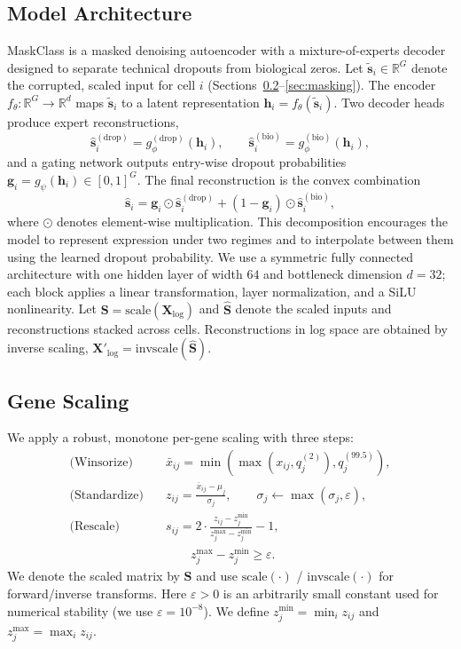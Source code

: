 \documentclass[sigconf,review]{acmart}
\theoremstyle{plain}
\theoremstyle{definition}
\theoremstyle{remark}
\begin{document}
\subsection{Model Architecture}
MaskClass is a masked denoising autoencoder with a mixture-of-experts decoder
designed to separate technical dropouts from biological zeros. Let
$\tilde{\mathbf{s}}_i\in\mathbb{R}^G$ denote the corrupted, scaled input for
cell $i$ (Sections~\ref{sec:scaling}--\ref{sec:masking}). The encoder
$f_\theta:\mathbb{R}^{G}\!\to\!\mathbb{R}^{d}$ maps $\tilde{\mathbf{s}}_i$ to a
latent representation $\mathbf{h}_i=f_\theta(\tilde{\mathbf{s}}_i)$.
Two decoder heads produce expert reconstructions,
\[
\hat{\mathbf{s}}^{(\mathrm{drop})}_i=g^{(\mathrm{drop})}_\phi(\mathbf{h}_i),\qquad
\hat{\mathbf{s}}^{(\mathrm{bio})}_i=g^{(\mathrm{bio})}_\phi(\mathbf{h}_i),
\]
and a gating network outputs entry-wise dropout probabilities
$\mathbf{g}_i=g_\psi(\mathbf{h}_i)\in[0,1]^G$. The final reconstruction is the
convex combination
\[
\hat{\mathbf{s}}_i=\mathbf{g}_i\odot \hat{\mathbf{s}}^{(\mathrm{drop})}_i + (1-\mathbf{g}_i)\odot \hat{\mathbf{s}}^{(\mathrm{bio})}_i,
\]
where $\odot$ denotes element-wise multiplication.
This decomposition encourages the model to represent expression under two
regimes and to interpolate between them using the learned dropout probability.
We use a symmetric fully connected architecture with one hidden layer of width
$64$ and bottleneck dimension $d{=}32$; each block applies a linear
transformation, layer normalization, and a SiLU nonlinearity.
Let $\mathbf{S}=\mathrm{scale}(\mathbf{X}_{\log})$ and $\hat{\mathbf{S}}$ denote
the scaled inputs and reconstructions stacked across cells. Reconstructions in
log space are obtained by inverse scaling,
$\mathbf{X}'_{\log}=\mathrm{invscale}(\hat{\mathbf{S}})$.

\subsection{Gene Scaling}
\label{sec:scaling}
We apply a robust, monotone per-gene scaling with three steps:
\[
\begin{aligned}
\text{(Winsorize)}\quad &\bar{x}_{ij}=\min(\max(x_{ij},q^{(2)}_j),q^{(99.5)}_j),\\
\text{(Standardize)}\quad &z_{ij}=\frac{\bar{x}_{ij}-\mu_j}{\sigma_j},\qquad
\sigma_j\leftarrow\max(\sigma_j,\varepsilon),\\
\text{(Rescale)}\quad &s_{ij}=2\cdot\frac{z_{ij}-z^{\min}_j}{z^{\max}_j-z^{\min}_j}-1,\\
&\qquad z^{\max}_j-z^{\min}_j\ge\varepsilon.
\end{aligned}
\]
We denote the scaled matrix by $\mathbf{S}$ and use
$\mathrm{scale}(\cdot)$ / $\mathrm{invscale}(\cdot)$ for forward/inverse
transforms.
Here $\varepsilon>0$ is an arbitrarily small constant used for numerical
stability (we use $\varepsilon=10^{-8}$).
We define $z^{\min}_j=\min_i z_{ij}$ and $z^{\max}_j=\max_i z_{ij}$.
\end{document}
